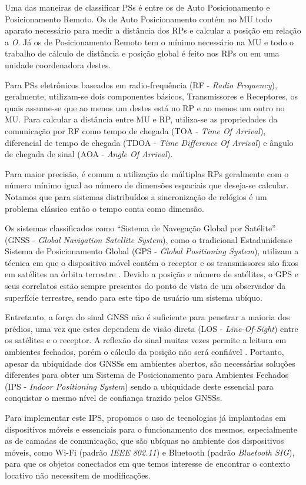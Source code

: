 Uma das maneiras de classificar PSs é entre os de Auto Posicionamento e
Posicionamento Remoto. Os de Auto Posicionamento contém no MU todo aparato
necessário para medir a distância dos RPs e calcular a posição em relação a
\textit{O}. Já os de Posicionamento Remoto tem o mínimo necessário na MU e todo
o trabalho de cálculo de distância e posição global é feito nos RPs ou em uma
unidade coordenadora destes.

Para PSs eletrônicos baseados em radio-frequência (RF - \textit{Radio
Frequency}), geralmente, utilizam-se dois componentes básicos, Transmissores e
Receptores, os quais assume-se que ao menos um destes está no RP e ao menos um
outro no MU. Para calcular a distância entre MU e RP, utiliza-se as propriedades
da comunicação por RF como tempo de chegada (TOA - \textit{Time Of Arrival}),
diferencial de tempo de chegada (TDOA - \textit{Time Difference Of Arrival}) e
ângulo de chegada de sinal (AOA - \textit{Angle Of Arrival}).

Para maior precisão, é comum a utilização de múltiplas RPs geralmente com o
número mínimo igual ao número de dimensões espaciais que deseja-se calcular.
Notamos que para sistemas distribuídos a sincronização de relógios é um problema
clássico então o tempo conta como dimensão.

Os sistemas classificados como ``Sistema de Navegação Global por Satélite''
(GNSS - \textit{Global Navigation Satellite System}), como o tradicional
Estadunidense Sistema de Posicionamento Global (GPS - \textit{Global Positioning
System}), utilizam a técnica em que o dispositivo móvel contém o receptor e os
transmissores são fixos em satélites na órbita terrestre \cite{Djuknic2001}.
Devido a posição e número de satélites, o GPS e seus correlatos estão sempre
presentes do ponto de vista de um observador da superfície terrestre, sendo para
este tipo de usuário um sistema ubíquo.

Entretanto, a força do sinal GNSS não é suficiente para penetrar a maioria dos
prédios, uma vez que estes dependem de visão direta (LOS -
\textit{Line-Of-Sight}) entre os satélites e o receptor. A reflexão do sinal
muitas vezes permite a leitura em ambientes fechados, porém o cálculo da posição
não será confiável \cite{Dartmouth2000}. Portanto, apesar da ubiquidade dos
GNSSs em ambientes abertos, são necessárias soluções diferentes para obter um
Sistema de Posicionamento para Ambientes Fechados (IPS - \textit{Indoor
Positioning System}) sendo a ubiquidade deste essencial para conquistar o mesmo
nível de confiança trazido pelos GNSSs.

Para implementar este IPS, propomos o uso de tecnologias já implantadas em
dispositivos móveis e essenciais para o funcionamento dos mesmos, especialmente
as de camadas de comunicação, que são ubíquas no ambiente dos dispositivos
móveis, como Wi-Fi (padrão \textit{IEEE 802.11}) e Bluetooth (padrão \textit{Bluetooth
SIG}), para que os objetos conectados em que temos interesse de encontrar o
contexto locativo não necessitem de modificações.